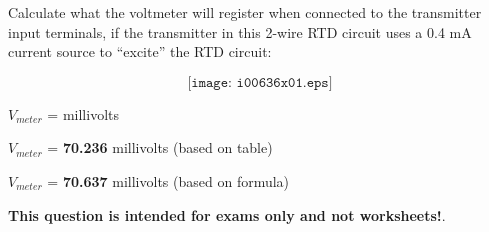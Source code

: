 

Calculate what the voltmeter will register when connected to the transmitter input terminals, if the transmitter in this 2-wire RTD circuit uses a 0.4 mA current source to ``excite'' the RTD circuit:

$$\texttt{[image: i00636x01.eps]}$$

$V_{meter}$ = \underbar{\hskip 50pt} millivolts







$V_{meter}$ = {\bf 70.236} millivolts (based on table)

\vskip 10pt

$V_{meter}$ = {\bf 70.637} millivolts (based on formula)







{\bf This question is intended for exams only and not worksheets!}.


